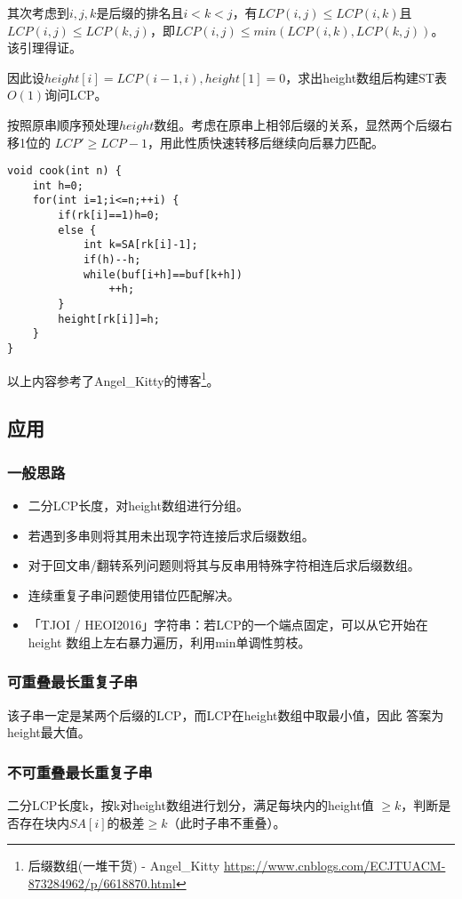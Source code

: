 其次考虑到$i,j,k$是后缀的排名且$i<k<j$，有$LCP(i,j)\leq LCP(i,k)$且
$LCP(i,j)\leq LCP(k,j)$，即$LCP(i,j)\leq min(LCP(i,k),LCP(k,j))$。
该引理得证。

因此设$height[i]=LCP(i-1,i),height[1]=0$，求出height数组后构建ST表$O(1)$询问LCP。

按照原串顺序预处理$height$数组。考虑在原串上相邻后缀的关系，显然两个后缀右移1位的
$LCP'\geq LCP-1$，用此性质快速转移后继续向后暴力匹配。

\begin{lstlisting}
void cook(int n) {
    int h=0;
    for(int i=1;i<=n;++i) {
        if(rk[i]==1)h=0;
        else {
            int k=SA[rk[i]-1];
            if(h)--h;
            while(buf[i+h]==buf[k+h])
                ++h;
        }
        height[rk[i]]=h;
    }
}
\end{lstlisting}
以上内容参考了Angel\_Kitty的博客\footnote{后缀数组(一堆干货) - Angel\_Kitty
    \url{https://www.cnblogs.com/ECJTUACM-873284962/p/6618870.html}
}。
\subsection{应用}
\subsubsection{一般思路}
\begin{itemize}
    \item 二分LCP长度，对height数组进行分组。
    \item 若遇到多串则将其用未出现字符连接后求后缀数组。
    \item 对于回文串/翻转系列问题则将其与反串用特殊字符相连后求后缀数组。
    \item 连续重复子串问题使用错位匹配解决。
    \item 「TJOI / HEOI2016」字符串：若LCP的一个端点固定，可以从它开始在height
    数组上左右暴力遍历，利用min单调性剪枝。
\end{itemize}
\subsubsection{可重叠最长重复子串}
该子串一定是某两个后缀的LCP，而LCP在height数组中取最小值，因此
答案为height最大值。
\subsubsection{不可重叠最长重复子串}
二分LCP长度k，按k对height数组进行划分，满足每块内的height值
$\geq k$，判断是否存在块内$SA[i]$的极差$\geq k$（此时子串不重叠）。
